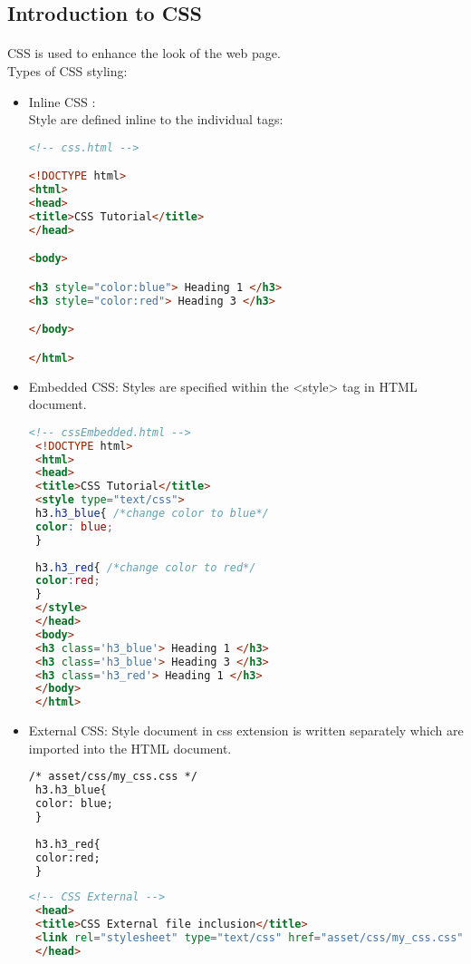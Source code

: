 \subsection{Introduction to CSS}
\paragraph{}CSS is used to enhance the look of the web page.\\
Types of CSS styling:
\begin{itemize}
	\item Inline CSS : 
	\\ Style are defined inline to the individual tags:
\begin{lstlisting}[language=html]
<!-- css.html -->

<!DOCTYPE html>
<html>
<head>
<title>CSS Tutorial</title>
</head>

<body>

<h3 style="color:blue"> Heading 1 </h3>
<h3 style="color:red"> Heading 3 </h3>

</body>

</html>
\end{lstlisting}
\item Embedded CSS:
 Styles are specified within the <style> tag in HTML document.\\
 \begin{lstlisting}[language=html]
 <!-- cssEmbedded.html -->
 <!DOCTYPE html>
 <html>
 <head>
 <title>CSS Tutorial</title>
 <style type="text/css">
 h3.h3_blue{ /*change color to blue*/
 color: blue;
 }
 
 h3.h3_red{ /*change color to red*/
 color:red;
 }
 </style>
 </head>
 <body>
 <h3 class='h3_blue'> Heading 1 </h3>
 <h3 class='h3_blue'> Heading 3 </h3>
 <h3 class='h3_red'> Heading 1 </h3>
 </body>
 </html>
 \end{lstlisting}
 \item External CSS: Style document in css extension is written separately which are imported into the HTML document.
 
 \begin{lstlisting}[language=html,numbers=none,style=base]
 /* asset/css/my_css.css */
 h3.h3_blue{
 color: blue;
 }
 
 h3.h3_red{
 color:red;
 }
 \end{lstlisting}
 
 \begin{lstlisting}[language=html,numbers=none,style=base]
 <!-- CSS External -->
 <head>
 <title>CSS External file inclusion</title>
 <link rel="stylesheet" type="text/css" href="asset/css/my_css.css">
 </head>
 \end{lstlisting}

\end{itemize}
